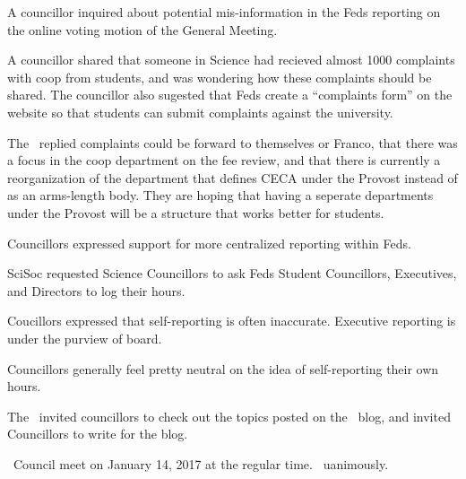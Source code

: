 \begin{information}
    A councillor inquired about potential mis-information in the Feds reporting
    on the online voting motion of the General Meeting.
\end{information}

\begin{information}
    A councillor shared that someone in Science had recieved almost 1000
    complaints with coop from students, and was wondering how these complaints
    should be shared. The councillor also sugested that Feds create a
    ``complaints form'' on the website so that students can submit complaints
    against the university.

    The \vped\ replied complaints could be forward to themselves or Franco,
    that there was a focus in the coop department on the fee review, and that
    there is currently a reorganization of the department that defines CECA
    under the Provost instead of as an arms-length body. They are hoping that
    having a seperate departments under the Provost will be a structure that
    works better for students. 

    Councillors expressed support for more centralized reporting within Feds. 
\end{information}

\begin{information}
    SciSoc requested Science Councillors to ask Feds Student Councillors, 
    Executives, and Directors to log their hours. 

    Coucillors expressed that self-reporting is often inaccurate. Executive
    reporting is under the purview of board. 

    Councillors generally feel pretty neutral on the idea of self-reporting 
    their own hours. 
\end{information}

\begin{information}
    The \vped\ invited councillors to check out the topics posted on the \ousa\
    blog, and invited Councillors to write for the blog. 
\end{information}

\begin{motion}
    \birt\ Council meet on January 14, 2017 at the regular time. 
    \movers{\jason}{\brian}
    \carries\ uanimously.
\end{motion}

